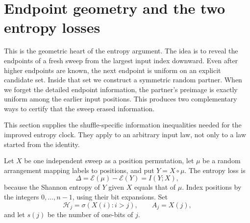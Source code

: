 \documentclass[11pt]{article}
\numberwithin{equation}{section}
\theoremstyle{definition}\newtheorem{definition}[theorem]{Definition}
\theoremstyle{remark}\newtheorem{remark}[theorem]{Remark}
\newcommand{\Ent}{\mathcal E}
\begin{document}
\section{Endpoint geometry and the two entropy losses}
\label{sec:information}
This is the geometric heart of the entropy argument.  The idea is to reveal
the endpoints of a fresh sweep from the largest input index downward.  Even
after higher endpoints are known, the next endpoint is uniform on an explicit
candidate set.  Inside that set we construct a symmetric random partner.  When
we forget the detailed endpoint information, the partner's preimage is exactly
uniform among the earlier input positions.  This produces two complementary
ways to certify that the sweep erased information.

This section supplies the shuffle-specific information inequalities needed
for the improved entropy clock. They apply to an arbitrary input law, not
only to a law started from the identity.

Let $X$ be one independent sweep as a position permutation, let $\mu$ be a
random arrangement mapping labels to positions, and put $Y=X\circ\mu$.
The entropy loss is
\begin{equation}\label{eq:delta}
 \Delta=\Ent(\mu)-\Ent(Y)=I(Y;X),
\end{equation}
because the Shannon entropy of $Y$ given $X$ equals that of $\mu$.
Index positions by the integers $0,\ldots,n-1$, using their bit expansions.
Set
\[
 \mathcal H_j=\sigma(X(i):i>j),\qquad A_j=X(j),
\]
and let $s(j)$ be the number of one-bits of $j$.
\end{document}
